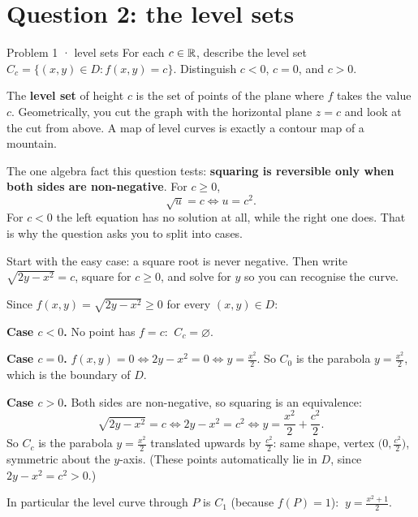 \section{Question 2: the level sets}

\begin{question}{Problem 1 \;·\; level sets}
For each $c\in\mathbb{R}$, describe the level set $C_c=\{(x,y)\in D: f(x,y)=c\}$.
Distinguish $c<0$, $c=0$, and $c>0$.
\end{question}

\begin{lesson}
The \textbf{level set} of height $c$ is the set of points of the plane where $f$ takes the value $c$.
Geometrically, you cut the graph with the horizontal plane $z=c$ and look at the cut from above.
A map of level curves is exactly a contour map of a mountain.

\smallskip
The one algebra fact this question tests: \textbf{squaring is reversible only when both sides are
non-negative}. For $c\ge0$,
\[
  \sqrt{u}=c\iff u=c^2 .
\]
For $c<0$ the left equation has no solution at all, while the right one does. That is why the
question asks you to split into cases.
\end{lesson}

\begin{howto}
Start with the easy case: a square root is never negative. Then write $\sqrt{2y-x^2}=c$, square
for $c\ge0$, and solve for $y$ so you can recognise the curve.
\end{howto}

\begin{answer}
Since $f(x,y)=\sqrt{2y-x^2}\ge0$ for every $(x,y)\in D$:

\textbf{Case $c<0$.} No point has $f=c$: $\ C_c=\varnothing$.

\textbf{Case $c=0$.} $f(x,y)=0\iff 2y-x^2=0\iff y=\frac{x^2}2$. So $C_0$ is the parabola
$y=\frac{x^2}2$, which is the boundary of $D$.

\textbf{Case $c>0$.} Both sides are non-negative, so squaring is an equivalence:
\[
  \sqrt{2y-x^2}=c\iff 2y-x^2=c^2\iff y=\frac{x^2}2+\frac{c^2}2 .
\]
So $C_c$ is the parabola $y=\frac{x^2}2$ translated upwards by $\frac{c^2}2$: same shape, vertex
$\big(0,\frac{c^2}2\big)$, symmetric about the $y$-axis. (These points automatically lie in $D$,
since $2y-x^2=c^2>0$.)

In particular the level curve through $P$ is $C_1$ (because $f(P)=1$): $\ y=\frac{x^2+1}2$.
\end{answer}

